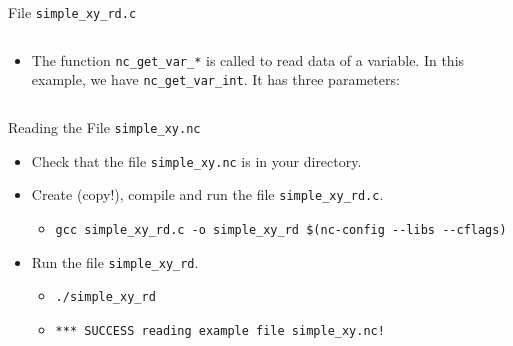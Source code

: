 \documentclass[compress,11pt,xcolor=svgnames,aspectratio=169]{beamer}
\begin{document}
\begin{frame}[fragile]{File \texttt{simple\_xy\_rd.c}}
\begin{columns}
\begin{column}{0.5\textwidth}
{\begin{itemize}
\item The function \verb|nc_get_var_*| is called to read data of a variable. In this example, we have \verb|nc_get_var_int|. It has three parameters:


\end{itemize}

}

\end{column}

\end{columns}

\end{frame}

\begin{frame}[fragile]{Reading the File \texttt{simple\_xy.nc}}

\begin{itemize}
\setlength\itemsep{0.6cm}

  \item Check that the file \verb|simple_xy.nc| is in your directory.

  \item Create (copy!), compile and run the file \verb|simple_xy_rd.c|.

        \begin{itemize}
          \item {\footnotesize  \verb|gcc simple_xy_rd.c -o simple_xy_rd $(nc-config --libs --cflags)| }
        \end{itemize}

  \item Run the file \verb|simple_xy_rd|.

        \begin{itemize}
        \setlength\itemsep{0.2cm}
          \item {\footnotesize  \verb|./simple_xy_rd|}
          \item {\footnotesize  \verb|*** SUCCESS reading example file simple_xy.nc!|}
        \end{itemize}

\end{itemize}

\end{frame}
\end{document}
